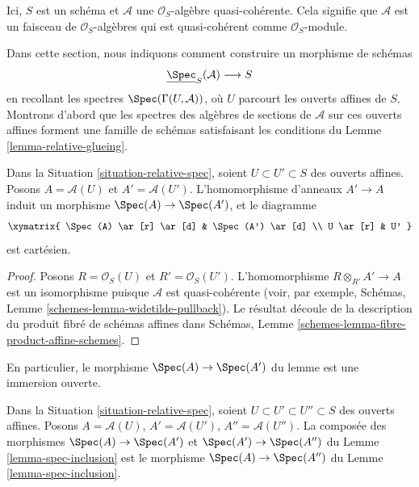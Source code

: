 \begin{situation}
\label{situation-relative-spec}
Ici, $S$ est un schéma et $\mathcal{A}$ une $\mathcal{O}_S$-algèbre
quasi-cohérente. Cela signifie que $\mathcal{A}$
est un faisceau de $\mathcal{O}_S$-algèbres qui est
quasi-cohérent comme $\mathcal{O}_S$-module.
\end{situation}

\noindent
Dans cette section, nous indiquons comment construire un morphisme de schémas
$$
\underline{\Spec}_S(\mathcal{A}) \longrightarrow S
$$
en recollant les spectres $\Spec(\Gamma(U, \mathcal{A}))$, où $U$ parcourt
les ouverts affines de $S$. Montrons d'abord que les spectres des algèbres
de sections de $\mathcal{A}$ sur ces ouverts affines forment une famille
de schémas satisfaisant les conditions
du Lemme \ref{lemma-relative-glueing}.

\begin{lemma}
\label{lemma-spec-inclusion}
Dans la Situation \ref{situation-relative-spec}, soient
$U \subset U' \subset S$ des ouverts affines. Posons
$A = \mathcal{A}(U)$ et $A' = \mathcal{A}(U')$.
L'homomorphisme d'anneaux $A' \to A$ induit un morphisme
$\Spec(A) \to \Spec(A')$, et le diagramme
$$
\xymatrix{
\Spec(A) \ar[r] \ar[d] &
\Spec(A') \ar[d] \\
U \ar[r] &
U'
}
$$
est cartésien.
\end{lemma}

\begin{proof}
Posons $R = \mathcal{O}_S(U)$ et $R' = \mathcal{O}_S(U')$.
L'homomorphisme $R \otimes_{R'} A' \to A$ est un isomorphisme puisque
$\mathcal{A}$ est quasi-cohérente (voir, par exemple, Schémas,
Lemme \ref{schemes-lemma-widetilde-pullback}).
Le résultat découle de la
description du produit fibré de schémas affines dans Schémas,
Lemme \ref{schemes-lemma-fibre-product-affine-schemes}.
\end{proof}

\noindent
En particulier, le morphisme $\Spec(A) \to \Spec(A')$ du lemme est une
immersion ouverte.

\begin{lemma}
\label{lemma-transitive-spec}
Dans la Situation \ref{situation-relative-spec}, soient
$U \subset U' \subset U'' \subset S$ des ouverts affines. Posons
$A = \mathcal{A}(U)$, $A' = \mathcal{A}(U')$,
$A'' = \mathcal{A}(U'')$.
La composée des morphismes $\Spec(A) \to \Spec(A')$ et
$\Spec(A') \to \Spec(A'')$ du Lemme
\ref{lemma-spec-inclusion} est le
morphisme $\Spec(A) \to \Spec(A'')$
du Lemme \ref{lemma-spec-inclusion}.
\end{lemma}

